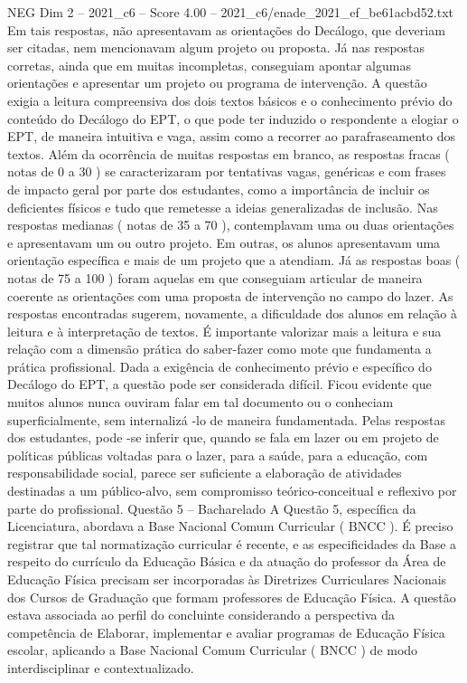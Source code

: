 \begin{textsample}{NEG Dim 2 – 2021\_c6 – Score 4.00 – 2021\_c6/enade\_2021\_ef\_be61acbd52.txt}
Em tais respostas, não apresentavam as orientações do Decálogo, que deveriam ser citadas, nem mencionavam algum projeto ou proposta.
Já nas respostas corretas, ainda que em muitas incompletas, conseguiam apontar algumas orientações e apresentar um projeto ou programa de intervenção.
A questão exigia a leitura compreensiva dos dois textos básicos e o conhecimento prévio do conteúdo do Decálogo do EPT, o que pode ter induzido o respondente a elogiar o EPT, de maneira intuitiva e vaga, assim como a recorrer ao parafraseamento dos textos.
Além da ocorrência de muitas respostas em branco, as respostas fracas ( notas de 0 a 30 ) se caracterizaram por tentativas vagas, genéricas e com frases de impacto geral por parte dos estudantes, como a importância de incluir os deficientes físicos e tudo que remetesse a ideias generalizadas de inclusão.
Nas respostas medianas ( notas de 35 a 70 ), contemplavam uma ou duas orientações e apresentavam um ou outro projeto.
Em outras, os alunos apresentavam uma orientação específica e mais de um projeto que a atendiam.
Já as respostas boas ( notas de 75 a 100 ) foram aquelas em que conseguiam articular de maneira coerente as orientações com uma proposta de intervenção no campo do lazer.
As respostas encontradas sugerem, novamente, a dificuldade dos alunos em relação à leitura e à interpretação de textos.
É importante valorizar mais a leitura e sua relação com a dimensão prática do saber-fazer como mote que fundamenta a prática profissional.
Dada a exigência de conhecimento prévio e específico do Decálogo do EPT, a questão pode ser considerada difícil.
Ficou evidente que muitos alunos nunca ouviram falar em tal documento ou o conheciam superficialmente, sem internalizá -lo de maneira fundamentada.
Pelas respostas dos estudantes, pode -se inferir que, quando se fala em lazer ou em projeto de políticas públicas voltadas para o lazer, para a saúde, para a educação, com responsabilidade social, parece ser suficiente a elaboração de atividades destinadas a um público-alvo, sem compromisso teórico-conceitual e reflexivo por parte do profissional.
Questão 5 – Bacharelado A Questão 5, específica da Licenciatura, abordava a Base Nacional Comum Curricular ( BNCC ).
É preciso registrar que tal normatização curricular é recente, e as especificidades da Base a respeito do currículo da Educação Básica e da atuação do professor da Área de Educação Física precisam ser incorporadas às Diretrizes Curriculares Nacionais dos Cursos de Graduação que formam professores de Educação Física.
A questão estava associada ao perfil do concluinte considerando a perspectiva da competência de Elaborar, implementar e avaliar programas de Educação Física escolar, aplicando a Base Nacional Comum Curricular ( BNCC ) de modo interdisciplinar e contextualizado.

\end{textsample}
